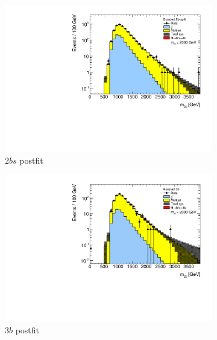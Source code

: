 \begin{figure}[htbp!]
\centering
\captionsetup{justification=centering}
    \vspace{-1cm}
    \begin{subfigure}[b]{0.25\textwidth}
        \includegraphics[width=\textwidth,angle=-90]{figures/boosted/results/postfitplot_s_2000_b2b.pdf}
        \caption{$2bs$ postfit}
        \label{fig:postfit2bs}
    \end{subfigure}
    \quad \quad \quad
    \begin{subfigure}[b]{0.25\textwidth}
        \includegraphics[width=\textwidth,angle=-90]{figures/boosted/results/postfitplot_s_2000_b3b.pdf}
        \caption{$3b$ postfit}
        \label{fig:postfit3b}
    \end{subfigure}
    \quad \quad \quad
    \begin{subfigure}[b]{0.25\textwidth}

\end{subfigure}
\end{figure}
